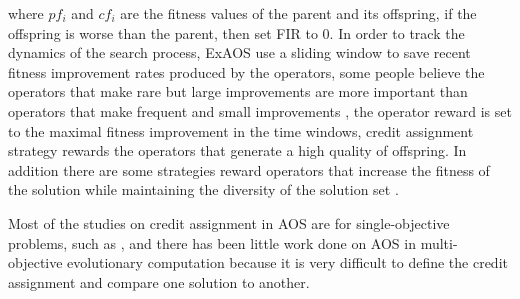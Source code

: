 \documentclass[journal]{IEEEtran}
\begin{document}
where $pf_{i}$ and $cf_{i}$ are the fitness values of the parent and its offspring, if the offspring is worse than the parent, then set FIR to 0.
In order to track the dynamics of the search process, ExAOS \cite{fialho2008extreme} use a sliding window to save recent fitness improvement rates produced by the operators,
some people believe the operators that make rare but large improvements are more important than operators that make frequent and small improvements \cite{fialho2009dynamic},
the operator reward is set to the maximal fitness improvement in the time windows, credit assignment strategy rewards the operators that generate a high quality of offspring.
In addition there are some strategies reward operators that increase the fitness of the solution while maintaining the diversity of the solution set \cite{auer2002finite}.

Most of the studies on credit assignment in AOS are for single-objective problems, such as \cite{fialho2009dynamic,cowling2000hyperheuristic}, and there has been little work done on AOS in multi-objective evolutionary computation because it is very difficult to define the credit assignment and compare one solution to another.
\end{document}
